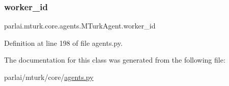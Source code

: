 \subsubsection{\texorpdfstring{worker\+\_\+id}{worker\_id}}
{\footnotesize\ttfamily parlai.\+mturk.\+core.\+agents.\+M\+Turk\+Agent.\+worker\+\_\+id}



Definition at line 198 of file agents.\+py.



The documentation for this class was generated from the following file\+:\begin{DoxyCompactItemize}
\item 
parlai/mturk/core/\hyperlink{parlai_2mturk_2core_2agents_8py}{agents.\+py}\end{DoxyCompactItemize}
